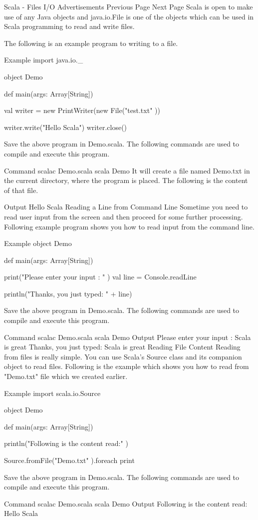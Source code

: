 Scala - Files I/O
Advertisements
 Previous Page Next Page  
Scala is open to make use of any Java objects and java.io.File is one of the objects which can be used in Scala programming to read and write files.

The following is an example program to writing to a file.

Example
import java.io._

object Demo {
   def main(args: Array[String]) {
      val writer = new PrintWriter(new File("test.txt" ))

      writer.write("Hello Scala")
      writer.close()
   }
}
Save the above program in Demo.scala. The following commands are used to compile and execute this program.

Command
\>scalac Demo.scala
\>scala Demo
It will create a file named Demo.txt in the current directory, where the program is placed. The following is the content of that file.

Output
Hello Scala
Reading a Line from Command Line
Sometime you need to read user input from the screen and then proceed for some further processing. Following example program shows you how to read input from the command line.

Example
object Demo {
   def main(args: Array[String]) {
      print("Please enter your input : " )
      val line = Console.readLine
      
      println("Thanks, you just typed: " + line)
   }
}
Save the above program in Demo.scala. The following commands are used to compile and execute this program.

Command
\>scalac Demo.scala
\>scala Demo
Output
Please enter your input : Scala is great
Thanks, you just typed: Scala is great
Reading File Content
Reading from files is really simple. You can use Scala's Source class and its companion object to read files. Following is the example which shows you how to read from "Demo.txt" file which we created earlier.

Example
import scala.io.Source

object Demo {
   def main(args: Array[String]) {
      println("Following is the content read:" )

      Source.fromFile("Demo.txt" ).foreach { 
         print 
      }
   }
}
Save the above program in Demo.scala. The following commands are used to compile and execute this program.

Command
\>scalac Demo.scala
\>scala Demo
Output
Following is the content read:
Hello Scala
